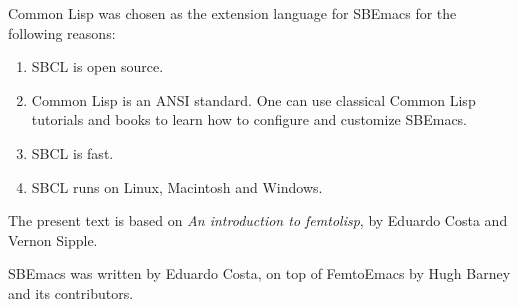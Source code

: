 \documentclass[a4paper,12pt,openany]{book}
\begin{document}
Common Lisp was chosen
as the extension language
for SBEmacs for the following reasons:
\begin{enumerate}
\item SBCL is open source.
\item Common Lisp is an ANSI standard. One can use
classical Common Lisp tutorials and books to learn
how to configure and customize SBEmacs.
\item SBCL is fast.
\item SBCL runs on Linux, Macintosh and Windows.
\end{enumerate}

The present text is based on {\em An introduction to femtolisp},
by Eduardo Costa and Vernon Sipple.

SBEmacs was written by Eduardo Costa, on top of FemtoEmacs by Hugh Barney
and its contributors.
\end{document}
